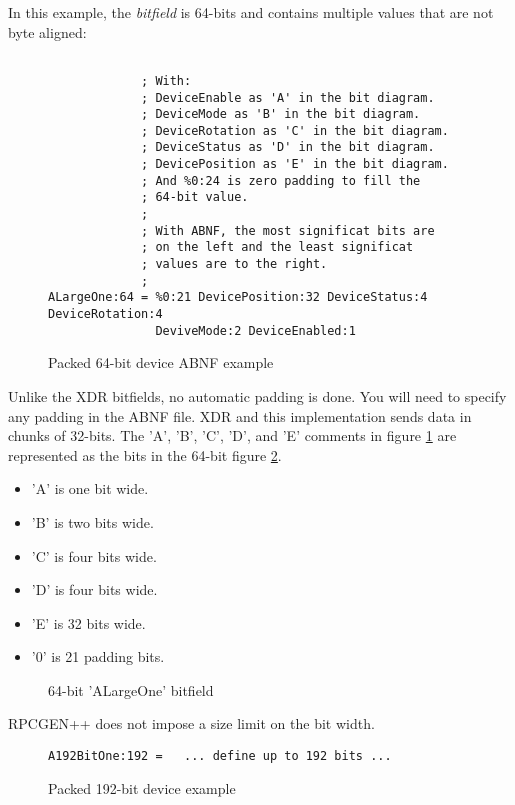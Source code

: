 In this example, the \textit{bitfield} is 64-bits and
contains multiple values that are not byte aligned:
\begin{figure}
\begin{verbatim}

             ; With:
             ; DeviceEnable as 'A' in the bit diagram.
             ; DeviceMode as 'B' in the bit diagram.
             ; DeviceRotation as 'C' in the bit diagram.
             ; DeviceStatus as 'D' in the bit diagram.
             ; DevicePosition as 'E' in the bit diagram.
             ; And %0:24 is zero padding to fill the
             ; 64-bit value.
             ;
             ; With ABNF, the most significat bits are
             ; on the left and the least significat
             ; values are to the right.
             ;
ALargeOne:64 = %0:21 DevicePosition:32 DeviceStatus:4 DeviceRotation:4
               DeviveMode:2 DeviceEnabled:1
\end{verbatim}
\caption{Packed 64-bit device ABNF example}
\label{fig:ALargeOneABNF}
\end{figure}
Unlike the XDR bitfields, no automatic padding is done.
You will need to specify any padding in the ABNF file.
XDR and this implementation sends data in chunks of 32-bits.
The 'A', 'B', 'C', 'D', and 'E' comments in figure
\ref{fig:ALargeOneABNF} are represented as the bits in
the 64-bit figure \ref{fig:ALargeOneBitsABNF}.
\begin{itemize}
\item 'A' is one bit wide.
\item 'B' is two bits wide.
\item 'C' is four bits wide.
\item 'D' is four bits wide.
\item 'E' is 32 bits wide.
\item '0' is 21 padding bits.
\end{itemize}
\begin{figure}
  
  \caption{64-bit 'ALargeOne' bitfield}
  \label{fig:ALargeOneBitsABNF}
\end{figure}

RPCGEN++ does not impose a size limit on the bit width.

\begin{figure}
\begin{verbatim}
A192BitOne:192 =   ... define up to 192 bits ...
\end{verbatim}
\caption{Packed 192-bit device example}
\label{fig:A192BitABNF}
\end{figure}

